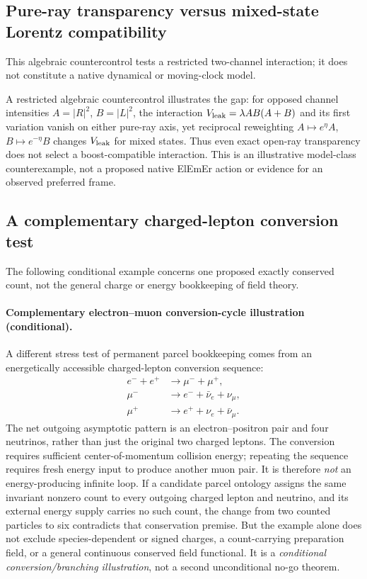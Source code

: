 \documentclass[11pt]{article}
\theoremstyle{definition}
\newcommand{\ElEmEr}{\mbox{ElEmEr}}
\begin{document}
\subsection{Pure-ray transparency versus mixed-state Lorentz compatibility}
\label{subsec:no-s-leak-countercontrol}
This algebraic countercontrol tests a restricted two-channel interaction;
it does not constitute a native dynamical or moving-clock model.

A restricted algebraic
countercontrol illustrates the gap: for opposed channel intensities
$A=|R|^2$, $B=|L|^2$, the interaction
$V_{\rm leak}=\lambda AB(A+B)$ and its first variation vanish on either pure-ray
axis, yet reciprocal reweighting $A\mapsto e^\eta A$,
$B\mapsto e^{-\eta}B$ changes $V_{\rm leak}$ for mixed states.  Thus even exact
open-ray transparency does not select a boost-compatible interaction.  This is
an illustrative model-class counterexample, not a proposed native \ElEmEr{}
action or evidence for an observed preferred frame.

\subsection{A complementary charged-lepton conversion test}
\label{subsec:conversion-cycle}
The following conditional example concerns one proposed exactly conserved
count, not the general charge or energy bookkeeping of field theory.

\paragraph{Complementary electron--muon conversion-cycle illustration (conditional).}
A different stress test of permanent parcel bookkeeping comes from an
energetically accessible charged-lepton conversion sequence:
\begin{align}
e^-+e^+ &\longrightarrow \mu^-+\mu^+,\\
\mu^- &\longrightarrow e^-+\bar\nu_e+\nu_\mu,\\
\mu^+ &\longrightarrow e^++\nu_e+\bar\nu_\mu.
\end{align}
The net outgoing asymptotic pattern is an electron--positron pair and four
neutrinos, rather than just the original two charged leptons.  The conversion
requires sufficient center-of-momentum collision energy; repeating the sequence
requires fresh energy input to produce another muon pair.  It is therefore
\emph{not} an energy-producing infinite loop.  If a candidate parcel ontology
assigns the same invariant nonzero count to every outgoing charged lepton and
neutrino, and its external energy supply carries no such count, the change
from two counted particles to six contradicts that conservation premise.  But the
example alone does not exclude species-dependent or signed charges, a
count-carrying preparation field, or a general continuous conserved field
functional.  It is a \emph{conditional conversion/branching illustration}, not a
second unconditional no-go theorem.
\end{document}
